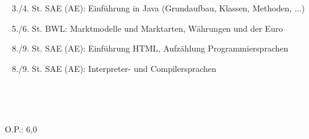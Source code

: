 {{	\textbullet~ 3./4. St. SAE (AE): Einführung in Java (Grundaufbau, Klassen, Methoden, ...)\par
	\textbullet~ 5./6. St. BWL: Marktmodelle und Marktarten, Währungen und der Euro\par
	\textbullet~ 8./9. St. SAE (AE): Einführung HTML, Aufzählung Programmiersprachen\par
	\textbullet~ 8./9. St. SAE (AE): Interpreter- und Compilersprachen\par
	\textbullet~ \par
	\textbullet~ 
	}{}{O.P.: 6,0}
}{}
\Unterschrift
\newpage

